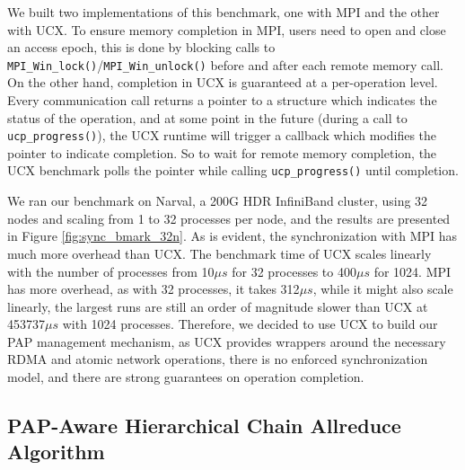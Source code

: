 

We built two implementations of this benchmark, one with \gls{MPI} and the other with \gls{UCX}. 
To ensure memory completion in \gls{MPI}, users need to open and close an access epoch, this is done by blocking calls to \texttt{MPI\_Win\_lock()}/\texttt{MPI\_Win\_unlock()} before and after each remote memory call.
On the other hand, completion in \gls{UCX} is guaranteed at a per-operation level. 
Every communication call returns a pointer to a structure which indicates the status of the operation, and at some point in the future (during a call to \texttt{ucp\_progress()}), the \gls{UCX} runtime will trigger a callback which modifies the pointer to indicate completion.
So to wait for remote memory completion, the \gls{UCX} benchmark polls the pointer while calling \texttt{ucp\_progress()} until completion.

We ran our benchmark on Narval, a 200G HDR InfiniBand cluster, using 32 nodes and scaling from 1 to 32 processes per node, and the results are presented in Figure \ref{fig:sync_bmark_32n}.
As is evident, the synchronization with \gls{MPI} has much more overhead than \gls{UCX}.
The benchmark time of \gls{UCX} scales linearly with the number of processes from 10$\mu s$ for 32 processes to 400$\mu s$ for 1024.
\gls{MPI} has more overhead, as with 32 processes, it takes 312$\mu s$, while it might also scale linearly, the largest runs are still an order of magnitude slower than \gls{UCX} at 453737$\mu s$ with 1024 processes.
Therefore, we decided to use \gls{UCX} to build our \gls{PAP} management mechanism, as \gls{UCX} provides wrappers around the necessary \gls{RDMA} and atomic network operations, there is no enforced synchronization model, and there are strong guarantees on operation completion. 



\subsection{PAP-Aware Hierarchical Chain Allreduce Algorithm}

